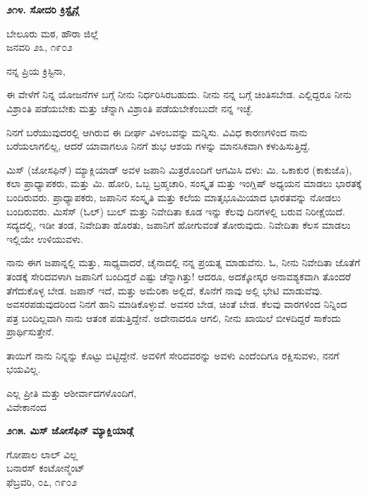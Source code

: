 \begin{center}
\textbf{೨೧೪. ಸೋದರಿ ಕ್ರಿಸ್ಟೈನ್ಗೆ}
\end{center}

\begin{flushright}
ಬೇಲೂರು ಮಠ, ಹೌರಾ ಜಿಲ್ಲೆ\\ಜನವರಿ ೨೩, ೧೯೦೨
\end{flushright}

ನನ್ನ ಪ್ರಿಯ ಕ್ರಿಸ್ಟಿನಾ,

ಈ ವೇಳೆಗೆ ನಿನ್ನ ಯೋಜನೆಗಳ ಬಗ್ಗೆ ನೀನು ನಿರ್ಧರಿಸಿರಬಹುದು. ನೀನು ನನ್ನ ಬಗ್ಗೆ ಚಿಂತಿಸಬೇಡ. ಎಲ್ಲಿದ್ದರೂ ನೀನು ವಿಶ್ರಾಂತಿ ಪಡೆಯಬೇಕು ಮತ್ತು ಚೆನ್ನಾಗಿ ವಿಶ್ರಾಂತಿ ಪಡೆಯಬೇಕೆಂಬುದೇ ನನ್ನ ಇಚ್ಛೆ.

ನಿನಗೆ ಬರೆಯುವುದರಲ್ಲಿ ಆಗಿರುವ ಈ ದೀರ್ಘ ವಿಳಂಬವನ್ನು ಮನ್ನಿಸು. ವಿವಿಧ ಕಾರಣಗಳಿಂದ ನಾನು ಬರೆಯಲಾಗಲಿಲ್ಲ, ಆದರೆ ಯಾವಾಗಲೂ ನಿನಗೆ ಶುಭ ಆಶಯ ಗಳನ್ನು ಮಾನಸಿಕವಾಗಿ ಕಳುಹಿಸುತ್ತಿದ್ದೆ.

ಮಿಸ್ (ಜೋಸಫಿನ್) ಮ್ಯಾಕ್ಲಿಯಾಡ್ ಅವಳ ಜಪಾನಿ ಮಿತ್ರರೊಂದಿಗೆ ಆಗಮಿಸಿ ದಳು: ಮಿ. ಒಕಾಕುರ (ಕಾಕುಜೊ), ಕಲಾ ಪ್ರಾಧ್ಯಾಪಕರು, ಮತ್ತು ಮಿ. ಹೋರಿ, ಒಬ್ಬ ಬ್ರಹ್ಮಚಾರಿ, ಸಂಸ್ಕೃತ ಮತ್ತು ಇಂಗ್ಲಿಷ್ ಅಧ್ಯಯನ ಮಾಡಲು ಭಾರತಕ್ಕೆ ಬಂದಿರುವರು. ಪ್ರಾಧ್ಯಾಪಕರು, ಜಪಾನಿನ ಸಂಸ್ಕೃತಿ ಮತ್ತು ಕಲೆಯ ಮಾತೃಭೂಮಿಯಾದ ಭಾರತವನ್ನು ನೋಡಲು ಬಂದಿರುವರು. ಮಿಸೆಸ್ (ಓಲ್) ಬುಲ್ ಮತ್ತು ನಿವೇದಿತಾ ಕೂಡ ಇನ್ನು ಕೆಲವು ದಿನಗಳಲ್ಲಿ ಬರುವ ನಿರೀಕ್ಷೆಯಿದೆ. ಸದ್ಯದಲ್ಲಿ, ಇಡೀ ತಂಡ, ನಿವೇದಿತಾ ಹೊರತು, ಜಪಾನಿಗೆ ಹೋಗುವಂತೆ ತೋರುವುದು. ನಿವೇದಿತಾ ಕೆಲಸ ಮಾಡಲು ಇಲ್ಲಿಯೇ ಉಳಿಯುವಳು.

ನಾನು ಈಗ ಜಪಾನ್ನಲ್ಲಿ ಮತ್ತು, ಸಾಧ್ಯವಾದರೆ, ಚೈನಾದಲ್ಲಿ ನನ್ನ ಪ್ರಯತ್ನ ಮಾಡುವೆನು. ಓ, ನೀನು ನಿವೇದಿತಾ ಜೊತೆಗೆ ತಂಡಕ್ಕೆ ಸೇರಿದವಳಾಗಿ ಜಪಾನಿಗೆ ಬಂದಿದ್ದರೆ ಎಷ್ಟು ಚೆನ್ನಾಗಿತ್ತು! ಆದರೂ, ಅದಕ್ಕೋಸ್ಕರ ಅನಾವಶ್ಯಕವಾಗಿ ತೊಂದರೆ ತೆಗೆದುಕೊಳ್ಳ ಬೇಡ. ಜಪಾನ್ ಇದೆ, ಮತ್ತು ಅಮೆರಿಕಾ ಅಲ್ಲಿದೆ, ಕೊನೆಗೆ ನಾವು ಅಲ್ಲಿ ಭೇಟಿ ಮಾಡುವೆವು. ಅವಸರಪಡುವುದರಿಂದ ನಿನಗೆ ಹಾನಿ ಮಾಡಿಕೊಳ್ಳುವೆ. ಅವಸರ ಬೇಡ, ಚಿಂತೆ ಬೇಡ. ಕೆಲವು ವಾರಗಳಿಂದ ನಿನ್ನಿಂದ ಪತ್ರ ಬಂದಿಲ್ಲವಾಗಿ ನಾನು ಆತಂಕ ಪಡುತ್ತಿದ್ದೇನೆ. ಅದೇನಾದರೂ ಆಗಲಿ, ನೀನು ಖಾಯಿಲೆ ಬೀಳದಿದ್ದರೆ ಸಾಕೆಂದು ಪ್ರಾರ್ಥಿಸುತ್ತೇನೆ.

ತಾಯಿಗೆ ನಾನು ನಿನ್ನನ್ನು ಕೊಟ್ಟು ಬಿಟ್ಟಿದ್ದೇನೆ. ಅವಳಿಗೆ ಸೇರಿದವರನ್ನು ಅವಳು ಎಂದೆಂದಿಗೂ ರಕ್ಷಿಸುವಳು, ನನಗೆ ಭಯವಿಲ್ಲ.

\begin{flushright}
ಎಲ್ಲ ಪ್ರೀತಿ ಮತ್ತು ಆಶೀರ್ವಾದಗಳೊಂದಿಗೆ,\\ವಿವೇಕಾನಂದ
\end{flushright}

\begin{center}
\textbf{೨೧೫. ಮಿಸ್ ಜೋಸೆಫಿನ್ ಮ್ಯಾಕ್ಲಿಯಾಡ್ಗೆ}
\end{center}

\begin{flushright}
ಗೋಪಾಲ ಲಾಲ್ ವಿಲ್ಲ\\ಬನಾರಸ್ ಕಂಟೋನ್ಮೆಂಟ್\\ಫೆಬ್ರವರಿ, ೦೭, ೧೯೦೨
\end{flushright}

